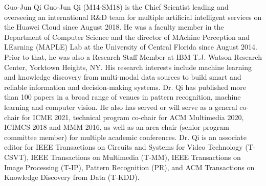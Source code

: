 \documentclass[10pt,journal,compsoc,twoside]{IEEEtran}
\begin{document}


%




%
\vspace{-12mm}
\begin{IEEEbiography}{Guo-Jun Qi}
Guo-Jun Qi (M14-SM18) is the Chief Scientist leading and overseeing an international R\&D team for multiple artificial intelligent services on the Huawei Cloud since August 2018. He was a faculty member in the Department of Computer Science and the director of MAchine Perception and LEarning (MAPLE) Lab at the University of Central Florida since August 2014. Prior to that, he was also a Research Staff Member at IBM T.J. Watson Research Center, Yorktown Heights, NY.
His research interests include machine learning and knowledge discovery from multi-modal data sources to build smart and reliable information and decision-making systems.
Dr. Qi has published more than 100 papers in a broad range of venues in pattern recognition, machine learning and computer vision.
He also has served or will serve as a general co-chair for ICME 2021, technical program co-chair for ACM Multimedia 2020, ICIMCS 2018 and MMM 2016, as well as an area chair (senior program committee member) for multiple academic conferences. Dr. Qi is an associate editor for IEEE Transactions on Circuits and Systems for Video Technology (T-CSVT), IEEE Transactions on Multimedia (T-MM), IEEE Transactions on Image Processing (T-IP), Pattern Recognition (PR), and ACM Transactions on Knowledge Discovery from Data (T-KDD).
\end{IEEEbiography}
\end{document}
